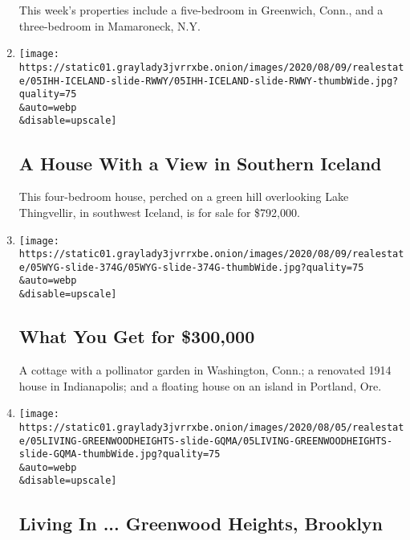 \begin{enumerate}
  This week's properties include a five-bedroom in Greenwich, Conn., and
  a three-bedroom in Mamaroneck, N.Y.
\item
  \href{/slideshow/2020/08/05/realestate/a-house-with-a-view-in-southern-iceland.html}{}

  \texttt{[image: https://static01.graylady3jvrrxbe.onion/images/2020/08/09/realestate/05IHH-ICELAND-slide-RWWY/05IHH-ICELAND-slide-RWWY-thumbWide.jpg?quality=75\\\&auto=webp\\\&disable=upscale]}

  \hypertarget{a-house-with-a-view-in-southern-iceland}{%
  \subsection{A House With a View in Southern
  Iceland}\label{a-house-with-a-view-in-southern-iceland}}

  This four-bedroom house, perched on a green hill overlooking Lake
  Thingvellir, in southwest Iceland, is for sale for \$792,000.
\item
  \href{/slideshow/2020/08/05/realestate/what-you-get-for-300000.html}{}

  \texttt{[image: https://static01.graylady3jvrrxbe.onion/images/2020/08/09/realestate/05WYG-slide-374G/05WYG-slide-374G-thumbWide.jpg?quality=75\\\&auto=webp\\\&disable=upscale]}

  \hypertarget{what-you-get-for-300000}{%
  \subsection{What You Get for
  \$300,000}\label{what-you-get-for-300000}}

  A cottage with a pollinator garden in Washington, Conn.; a renovated
  1914 house in Indianapolis; and a floating house on an island in
  Portland, Ore.
\item
  \href{/slideshow/2020/08/05/realestate/living-in-greenwood-heights-brooklyn.html}{}

  \texttt{[image: https://static01.graylady3jvrrxbe.onion/images/2020/08/05/realestate/05LIVING-GREENWOODHEIGHTS-slide-GQMA/05LIVING-GREENWOODHEIGHTS-slide-GQMA-thumbWide.jpg?quality=75\\\&auto=webp\\\&disable=upscale]}

  \hypertarget{living-in--greenwood-heights-brooklyn}{%
  \subsection{Living In ... Greenwood Heights,
  Brooklyn}\label{living-in--greenwood-heights-brooklyn}}


\end{enumerate}
